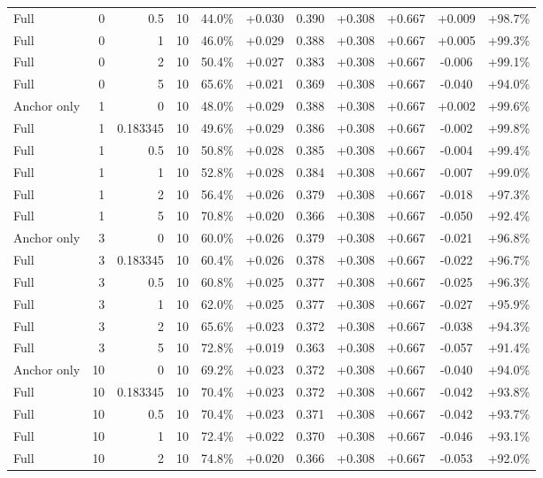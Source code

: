 \begin{table}[htbp]
\begin{tabular}{lrrrccccccc}
Full & 0 & 0.5 & 10 & 44.0\% & +0.030 & 0.390 & +0.308 & +0.667 & +0.009 & +98.7\% \\
Full & 0 & 1 & 10 & 46.0\% & +0.029 & 0.388 & +0.308 & +0.667 & +0.005 & +99.3\% \\
Full & 0 & 2 & 10 & 50.4\% & +0.027 & 0.383 & +0.308 & +0.667 & -0.006 & +99.1\% \\
Full & 0 & 5 & 10 & 65.6\% & +0.021 & 0.369 & +0.308 & +0.667 & -0.040 & +94.0\% \\
Anchor only & 1 & 0 & 10 & 48.0\% & +0.029 & 0.388 & +0.308 & +0.667 & +0.002 & +99.6\% \\
Full & 1 & 0.183345 & 10 & 49.6\% & +0.029 & 0.386 & +0.308 & +0.667 & -0.002 & +99.8\% \\
Full & 1 & 0.5 & 10 & 50.8\% & +0.028 & 0.385 & +0.308 & +0.667 & -0.004 & +99.4\% \\
Full & 1 & 1 & 10 & 52.8\% & +0.028 & 0.384 & +0.308 & +0.667 & -0.007 & +99.0\% \\
Full & 1 & 2 & 10 & 56.4\% & +0.026 & 0.379 & +0.308 & +0.667 & -0.018 & +97.3\% \\
Full & 1 & 5 & 10 & 70.8\% & +0.020 & 0.366 & +0.308 & +0.667 & -0.050 & +92.4\% \\
Anchor only & 3 & 0 & 10 & 60.0\% & +0.026 & 0.379 & +0.308 & +0.667 & -0.021 & +96.8\% \\
Full & 3 & 0.183345 & 10 & 60.4\% & +0.026 & 0.378 & +0.308 & +0.667 & -0.022 & +96.7\% \\
Full & 3 & 0.5 & 10 & 60.8\% & +0.025 & 0.377 & +0.308 & +0.667 & -0.025 & +96.3\% \\
Full & 3 & 1 & 10 & 62.0\% & +0.025 & 0.377 & +0.308 & +0.667 & -0.027 & +95.9\% \\
Full & 3 & 2 & 10 & 65.6\% & +0.023 & 0.372 & +0.308 & +0.667 & -0.038 & +94.3\% \\
Full & 3 & 5 & 10 & 72.8\% & +0.019 & 0.363 & +0.308 & +0.667 & -0.057 & +91.4\% \\
Anchor only & 10 & 0 & 10 & 69.2\% & +0.023 & 0.372 & +0.308 & +0.667 & -0.040 & +94.0\% \\
Full & 10 & 0.183345 & 10 & 70.4\% & +0.023 & 0.372 & +0.308 & +0.667 & -0.042 & +93.8\% \\
Full & 10 & 0.5 & 10 & 70.4\% & +0.023 & 0.371 & +0.308 & +0.667 & -0.042 & +93.7\% \\
Full & 10 & 1 & 10 & 72.4\% & +0.022 & 0.370 & +0.308 & +0.667 & -0.046 & +93.1\% \\
Full & 10 & 2 & 10 & 74.8\% & +0.020 & 0.366 & +0.308 & +0.667 & -0.053 & +92.0\% \\

\end{tabular}
\end{table}
